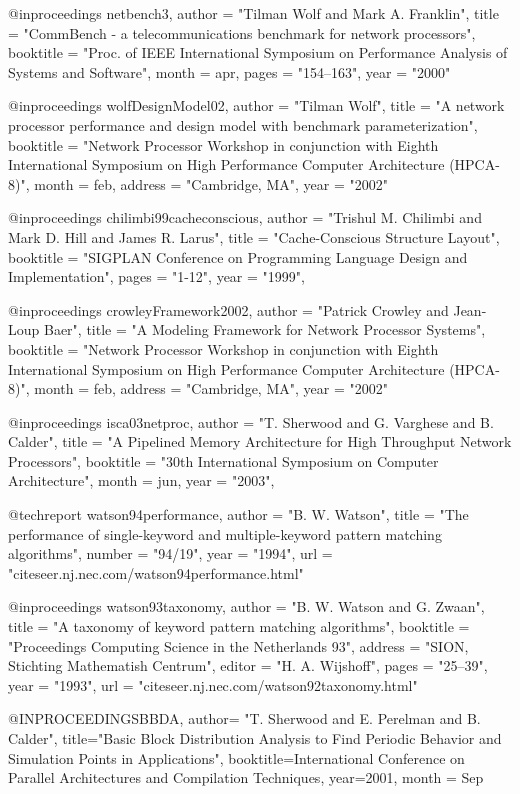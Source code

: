 @inproceedings{ netbench3,
    author = "Tilman Wolf and Mark A. Franklin",
    title = "{CommBench} - a telecommunications benchmark for network processors",
    booktitle = "Proc. of IEEE International Symposium on Performance Analysis of Systems and Software",
    month = apr,
    pages = "154--163",
    year = "2000"
}

@inproceedings{ wolfDesignModel02,
    author = "Tilman Wolf",
    title = "A network processor performance and design model with benchmark parameterization",
    booktitle = "Network Processor Workshop in conjunction with
	Eighth International Symposium on High Performance Computer 
	Architecture (HPCA-8)",
    month = feb,
    address = "Cambridge, MA",
    year = "2002"
}

@inproceedings{ chilimbi99cacheconscious,
    author = "Trishul M. Chilimbi and Mark D. Hill and James R. Larus",
    title = "Cache-Conscious Structure Layout",
    booktitle = "{SIGPLAN} Conference on Programming Language Design and Implementation",
    pages = "1-12",
    year = "1999",
}

@inproceedings{ crowleyFramework2002,
    author = "Patrick Crowley and Jean-Loup Baer",
    title = "A Modeling Framework for Network Processor Systems",
    booktitle = "Network Processor Workshop in conjunction with
	Eighth International Symposium on High Performance Computer 
	Architecture (HPCA-8)",
    month = feb,
    address = "Cambridge, MA",
    year = "2002"
}


@inproceedings{ isca03netproc,
    author = "T. Sherwood and G. Varghese and B. Calder",
    title = "A Pipelined Memory Architecture for High Throughput Network Processors",
    booktitle = "30th International Symposium on Computer Architecture",
    month = jun,
    year = "2003",
}

@techreport{ watson94performance,
    author = "B. W. Watson",
    title = "The performance of single-keyword and multiple-keyword pattern matching algorithms",
    number = "94/19",
    year = "1994",
    url = "citeseer.nj.nec.com/watson94performance.html" }

@inproceedings{ watson93taxonomy,
    author = "B. W. Watson and G. Zwaan",
    title = "A taxonomy of keyword pattern matching algorithms",
    booktitle = "Proceedings Computing Science in the Netherlands 93",
    address = "SION, Stichting Mathematish Centrum",
    editor = "H. A. Wijshoff",
    pages = "25--39",
    year = "1993",
    url = "citeseer.nj.nec.com/watson92taxonomy.html" }

@INPROCEEDINGS{BBDA,
  author= "T. Sherwood and E. Perelman and B. Calder",
  title="Basic Block Distribution Analysis to Find Periodic Behavior and Simulation Points in Applications",
  booktitle={International Conference on Parallel Architectures and Compilation Techniques},
  year=2001,
  month = Sep
}

